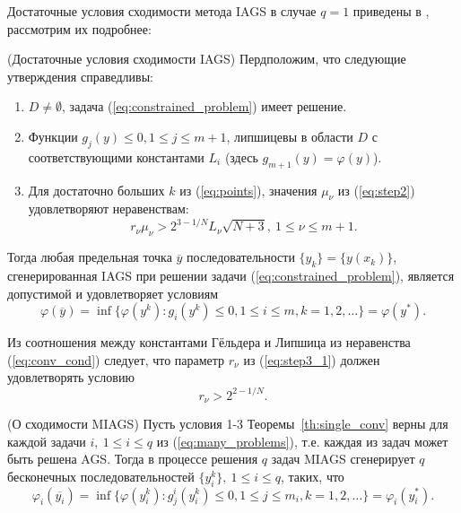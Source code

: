 Достаточные условия сходимости метода IAGS в случае \(q=1\) приведены в \cite{Strongin2000}, рассмотрим их подробнее:
\begin{theorem} (Достаточные условия сходимости IAGS)
  \label{th:single_conv}
  Пердположим, что следующие утверждения справедливы:
  \begin{enumerate}
    \item \(D\ne\emptyset\), задача (\ref{eq:constrained_problem}) имеет решение.
    \item Функции \(g_j(y)\leqslant 0, 1\leqslant j\leqslant m + 1\), липшицевы в области \(D\) с соответствующими константами \(L_i\)
     (здесь \(g_{m+1}(y)=\varphi(y)\)).
    \item Для достаточно больших \(k\) из (\ref{eq:points}),
    значения \(\mu_\nu\) из (\ref{eq:step2}) удовлетворяют неравенствам:
    \begin{equation}
      r_\nu\mu_\nu > 2^{3-1/N}L_\nu \sqrt{N+3},\: 1\leqslant \nu \leqslant m + 1.
    \end{equation}
  \end{enumerate}
  Тогда любая предельная точка \(\overline{y}\) последовательности \(\{y_k\} = \{y(x_k)\}\), сгенерированная
  IAGS при решении задачи (\ref{eq:constrained_problem}), является допустимой и удовлетворяет условиям
\begin{equation}
  \varphi(\overline{y})=\inf\{ \varphi(y^k): g_i(y^k)\leqslant 0,1\leqslant i\leqslant m, k=1,2,\dots\}=\varphi(y^*).
\end{equation}
\end{theorem}

\begin{remark}
  \label{rem:r1}
  Из соотношения между константами Гёльдера и Липшица из неравенства (\ref{eq:conv_cond}) следует, что
  параметр \(r_\nu\) из (\ref{eq:step3_1}) должен удовлетворять условию
  \begin{equation}
    r_\nu > 2^{2 - 1/N}.
  \end{equation}
\end{remark}

\begin{theorem}
  \label{th:multi_conv}
   (О сходимости MIAGS) Пусть условия 1-3 Теоремы~\ref{th:single_conv} верны для каждой задачи \(i,\:1\leqslant i\leqslant q\) из (\ref{eq:many_problems}),
т.е. каждая из задач может быть решена AGS.
  Тогда в процессе решения \(q\) задач MIAGS сгенерирует
  \(q\) бесконечных последовательностей \(\{y^k_i\},\:1\leqslant i\leqslant q\), таких, что
  \begin{displaymath}
    \varphi_i(\overline{y_i})=\inf\{ \varphi(y^k_i): g^i_j(y^k_i)\leqslant 0,1\leqslant j\leqslant m_i, k=1,2,\dots\}=\varphi_i(y^*_i).
  \end{displaymath}
\end{theorem}

